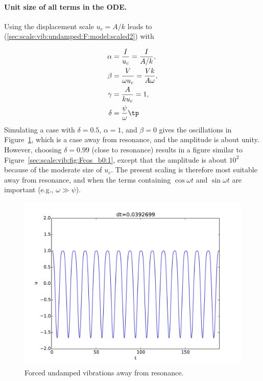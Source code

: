 \documentclass[graybox,envcountchap,sectrefs,final]{svmonodo}
\begin{document}
\paragraph{Unit size of all terms in the ODE.}
Using the displacement scale $u_c=A/k$ leads to
(\ref{sec:scale:vib:undamped:F:model:scaled2}) with

\begin{align*}
\alpha &= \frac{I}{u_c} = \frac{I}{A/k},\\ 
\beta  &= \frac{V}{\omega u_c} = \frac{V k}{A\omega},\\ 
\gamma &= \frac{A}{ku_c} = 1,\\ 
\delta &= \frac{\psi}{\omega}\tp
\end{align*}
Simulating a case with $\delta=0.5$, $\alpha=1$, and $\beta=0$ gives
the oscillations in Figure~\ref{sec:scale:vib:fig:Fcos_b0:2}, which is
a case away from resonance, and the amplitude is about unity. However,
choosing $\delta =0.99$ (close to resonance) results in a figure
similar to Figure~\ref{sec:scale:vib:fig:Fcos_b0:1}, except that the
amplitude is about $10^2$ because of the moderate size of $u_c$.
The present scaling is therefore most suitable away from resonance,
and when the terms containing $\cos\omega t$ and $\sin\omega t$
are important (e.g., $\omega\gg\psi$).



\begin{figure}[!ht]  %
  \centerline{\includegraphics[width=1.0\linewidth]{fig-scaling/vib_delta05_b0_Fcos.pdf}}
  \caption{
  Forced undamped vibrations away from resonance. \label{sec:scale:vib:fig:Fcos_b0:2}
  }
\end{figure}
\end{document}
